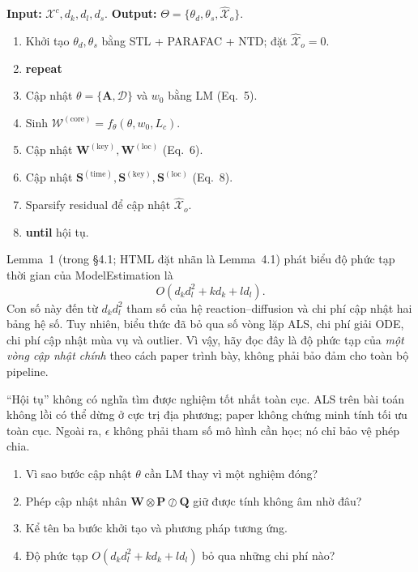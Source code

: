 \begin{tcolorbox}[enhanced,breakable,colback=white,colframe=DTNavy,arc=1.5mm,
  title={\sffamily\bfseries Algorithm 2 --- ModelEstimation (tóm tắt)},fonttitle=\small,
  coltitle=white,colbacktitle=DTNavy,left=3mm,right=3mm,top=2mm,bottom=2mm]
\textbf{Input:} $\mathcal{X}^{c},d_k,d_l,d_s$.\quad
\textbf{Output:} $\Theta=\{\theta_d,\theta_s,\widehat{\mathcal{X}}_o\}$.
\begin{enumerate}[leftmargin=1.5em]
  \item Khởi tạo $\theta_d,\theta_s$ bằng STL + PARAFAC + NTD; đặt $\widehat{\mathcal{X}}_o=0$.
  \item \textbf{repeat}
  \item \quad Cập nhật $\theta=\{\mathbf{A},\mathcal{D}\}$ và $w_0$ bằng LM (Eq.~5).
  \item \quad Sinh $\mathcal{W}^{(\mathrm{core})}=f_\theta(\theta,w_0,L_c)$.
  \item \quad Cập nhật $\mathbf{W}^{(\mathrm{key})},\mathbf{W}^{(\mathrm{loc})}$ (Eq.~6).
  \item \quad Cập nhật $\mathbf{S}^{(\mathrm{time})},\mathbf{S}^{(\mathrm{key})},
        \mathbf{S}^{(\mathrm{loc})}$ (Eq.~8).
  \item \quad Sparsify residual để cập nhật $\widehat{\mathcal{X}}_o$.
  \item \textbf{until} hội tụ.
\end{enumerate}
\end{tcolorbox}

Lemma~1 (trong §4.1; HTML đặt nhãn là Lemma~4.1) phát biểu độ phức tạp thời gian của ModelEstimation là
\[
  O(d_k d_l^2+kd_k+ld_l).
\]
Con số này đến từ $d_k d_l^2$ tham số của hệ reaction--diffusion và chi phí cập nhật hai bảng hệ
số. Tuy nhiên, biểu thức đã bỏ qua số vòng lặp ALS, chi phí giải ODE, chi phí cập nhật mùa vụ và
outlier. Vì vậy, hãy đọc đây là độ phức tạp của \emph{một vòng cập nhật chính} theo cách paper
trình bày, không phải bảo đảm cho toàn bộ pipeline.

\begin{commonmistake}
``Hội tụ'' không có nghĩa tìm được nghiệm tốt nhất toàn cục. ALS trên bài toán không lồi có thể
dừng ở cực trị địa phương; paper không chứng minh tính tối ưu toàn cục. Ngoài ra, $\epsilon$ không
phải tham số mô hình cần học; nó chỉ bảo vệ phép chia.
\end{commonmistake}

\begin{selfcheck}
\begin{enumerate}
  \item Vì sao bước cập nhật $\theta$ cần LM thay vì một nghiệm đóng?
  \item Phép cập nhật nhân $\mathbf{W}\otimes\mathbf{P}\oslash\mathbf{Q}$ giữ được tính không âm nhờ đâu?
  \item Kể tên ba bước khởi tạo và phương pháp tương ứng.
  \item Độ phức tạp $O(d_kd_l^2+kd_k+ld_l)$ bỏ qua những chi phí nào?
\end{enumerate}
\end{selfcheck}
